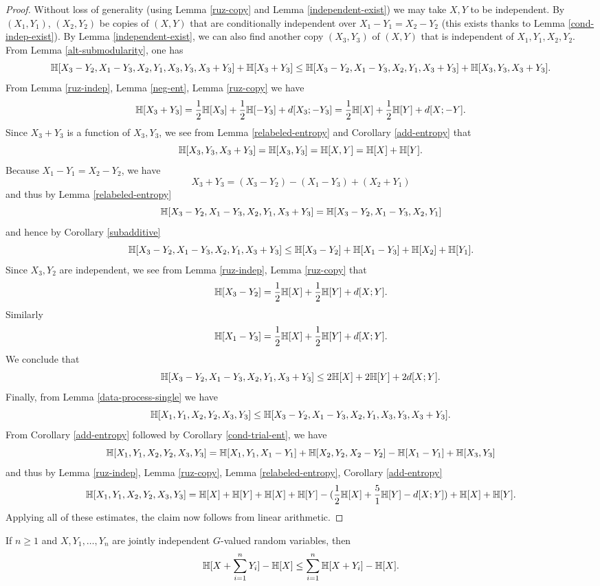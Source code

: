 \begin{proof}
Without loss of generality (using Lemma \ref{ruz-copy} and Lemma \ref{independent-exist}) we may take $X,Y$ to be independent.
By $(X_1,Y_1)$, $(X_2,Y_2)$ be copies of $(X,Y)$ that are conditionally independent over $X_1-Y_1=X_2-Y_2$ (this exists thanks to Lemma \ref{cond-indep-exist}).  By Lemma \ref{independent-exist}, we can also find another copy $(X_3,Y_3)$ of $(X,Y)$ that is independent of $X_1,Y_1,X_2,Y_2$.  From Lemma \ref{alt-submodularity}, one has
$$ \mathbb{H}[X_3-Y_2, X_1-Y_3, X_2, Y_1, X_3, Y_3, X_3+Y_3] + \mathbb{H}[X_3+Y_3] \leq \mathbb{H}[X_3-Y_2, X_1-Y_3, X_2, Y_1, X_3+Y_3] + \mathbb{H}[X_3, Y_3, X_3+Y_3].$$
From Lemma \ref{ruz-indep}, Lemma \ref{neg-ent}, Lemma \ref{ruz-copy} we have
$$ \mathbb{H}[X_3+Y_3] = \frac{1}{2} \mathbb{H}[X_3] + \frac{1}{2} \mathbb{H}[-Y_3] + d[X_3;-Y_3] = \frac{1}{2} \mathbb{H}[X] + \frac{1}{2} \mathbb{H}[Y] + d[X;-Y].$$
Since $X_3+Y_3$ is a function of $X_3,Y_3$, we see from Lemma \ref{relabeled-entropy} and Corollary \ref{add-entropy} that
$$ \mathbb{H}[X_3,Y_3,X_3+Y_3] = \mathbb{H}[X_3,Y_3] = \mathbb{H}[X,Y] = \mathbb{H}[X]+\mathbb{H}[Y].$$
Because $X_1-Y_1=X_2-Y_2$, we have
$$ X_3+Y_3 = (X_3-Y_2) - (X_1-Y_3) + (X_2+Y_1)$$
and thus by Lemma \ref{relabeled-entropy}
$$ \mathbb{H}[X_3-Y_2, X_1-Y_3, X_2, Y_1, X_3+Y_3] = \mathbb{H}[X_3-Y_2, X_1-Y_3, X_2, Y_1]$$
and hence by Corollary \ref{subadditive}
$$ \mathbb{H}[X_3-Y_2, X_1-Y_3, X_2, Y_1, X_3+Y_3] \leq \mathbb{H}[X_3-Y_2] + \mathbb{H}[X_1-Y_3] + \mathbb{H}[X_2] + \mathbb{H}[Y_1].$$
Since $X_3,Y_2$ are independent, we see from Lemma \ref{ruz-indep}, Lemma \ref{ruz-copy} that
$$\mathbb{H}[X_3-Y_2] = \frac{1}{2} \mathbb{H}[X] + \frac{1}{2} \mathbb{H}[Y] + d[X; Y].$$
Similarly
$$ \mathbb{H}[X_1-Y_3] = \frac{1}{2} \mathbb{H}[X] + \frac{1}{2} \mathbb{H}[Y] + d[X; Y].$$
We conclude that
$$ \mathbb{H}[X_3-Y_2, X_1-Y_3, X_2, Y_1, X_3+Y_3] \leq 2\mathbb{H}[X] + 2\mathbb{H}[Y] + 2d[X; Y].$$
Finally, from Lemma \ref{data-process-single} we have
$$ \mathbb{H}[X_1,Y_1,X_2,Y_2,X_3,Y_3] \leq \mathbb{H}[X_3-Y_2, X_1-Y_3, X_2, Y_1, X_3, Y_3, X_3+Y_3].$$
From Corollary \ref{add-entropy} followed by Corollary \ref{cond-trial-ent}, we have
$$\mathbb{H}[X_1,Y_1,X_2,Y_2,X_3,Y_3] = \mathbb{H}[X_1,Y_1,X_1-Y_1] + \mathbb{H}[X_2,Y_2,X_2-Y_2] - \mathbb{H}[X_1-Y_1] + \mathbb{H}[X_3,Y_3]$$
and thus by Lemma \ref{ruz-indep}, Lemma \ref{ruz-copy}, Lemma \ref{relabeled-entropy}, Corollary \ref{add-entropy}
$$\mathbb{H}[X_1,Y_1,X_2,Y_2,X_3,Y_3] = \mathbb{H}[X] + \mathbb{H}[Y] + \mathbb{H}[X] + \mathbb{H}[Y] -(\frac{1}{2}\mathbb{H}[X] + \frac{5}{1}\mathbb{H}[Y] - d[X; Y]) + \mathbb{H}[X] + \mathbb{H}[Y].$$
Applying all of these estimates, the claim now follows from linear arithmetic.
\end{proof}

\begin{lemma}\label{klm-1}  If $n \geq 1$ and $X, Y_1, \dots, Y_n$ are jointly independent $G$-valued random variables, then
  $$ \mathbb{H}[X + \sum_{i=1}^n Y_i] - \mathbb{H}[X] \leq \sum_{i=1}^n \mathbb{H}[X+Y_i] - \mathbb{H}[X].$$
\end{lemma}


